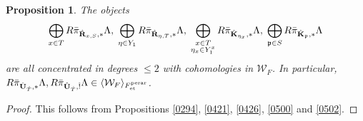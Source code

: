 \documentclass{amsart}
\newtheorem{Prop}[Thm]{Proposition}
\theoremstyle{remark}
\numberwithin{equation}{subsection}
\newcommand{\et}{\mathrm{et}}
\newcommand{\perar}{\mathrm{perar}}
\newcommand{\alg}[1]{\mathbf{#1}}
\newcommand{\ideal}[1]{\mathfrak{#1}}
\newcommand{\genby}[1]{\langle #1 \rangle}
\begin{document}
\begin{Prop} \label{0428}
	The objects
		\[
			\bigoplus_{x \in T}
				R \Bar{\pi}_{\Hat{\alg{R}}_{x, S}, \ast} \Lambda,\;
			\bigoplus_{\eta \in Y_{1}}
				R \Bar{\pi}_{\Hat{\alg{R}}_{\eta, T}, \ast} \Lambda,\;
			\bigoplus_{
				\substack{
					x \in T \\
					\eta_{x} \in Y_{1}^{x}
				}
			}
				R \Bar{\pi}_{\Hat{\alg{K}}_{\eta_{x}}, \ast} \Lambda,\;
			\bigoplus_{\ideal{p} \in S}
				R \Bar{\pi}_{\Hat{\alg{K}}_{\ideal{p}}, \ast} \Lambda
		\]
	are all concentrated in degrees $\le 2$ with cohomologies in $\mathcal{W}_{F}$.
	In particular,
		$
				R \Bar{\pi}_{\Hat{\alg{U}}_{\Hat{T}}, \ast} \Lambda,
				R \Bar{\pi}_{\Hat{\alg{U}}_{\Hat{T}}, \Hat{!}} \Lambda
			\in
				\genby{\mathcal{W}_{F}}_{F^{\perar}_{\et}}
		$.
\end{Prop}

\begin{proof}
	This follows from
	Propositions \ref{0294}, \ref{0421}, \ref{0426}, \ref{0500} and \ref{0502}.
\end{proof}
\end{document}

